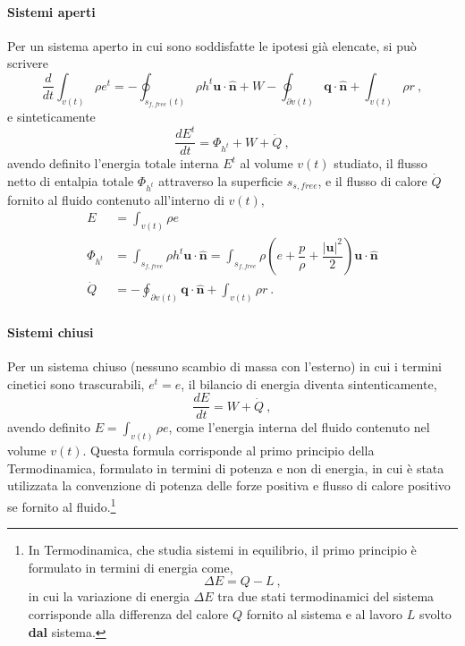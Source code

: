 \paragraph{Sistemi aperti}
Per un sistema aperto in cui sono soddisfatte le ipotesi già elencate, si può scrivere
\begin{equation}
 \dfrac{d}{dt} \displaystyle\int_{v(t)} \rho e^t = - \oint_{s_{f,free}(t)} \rho h^t \bm{u} \cdot \bm{\hat{n}}
  + W - \oint_{\partial v(t)} \bm{q} \cdot \bm{\hat{n}} + \int_{v(t)} \rho r \ ,
\end{equation}
e sinteticamente
\begin{equation}
  \dfrac{d E^t}{d t} = \Phi_{h^t} + W + \dot{Q} \ ,
\end{equation}
avendo definito l'energia totale interna $E^t$ al volume $v(t)$ studiato, il flusso netto di entalpia totale $\Phi_{h^t}$ attraverso la superficie $s_{s,free}$, e il flusso di calore $\dot{Q}$ fornito al fluido contenuto all'interno di $v(t)$,
\begin{equation}
\begin{aligned}
  E & = \int_{v(t)} \rho e \\
  \Phi_{h^t} & = \int_{s_{f,free}} \rho h^t \bm{u} \cdot \bm{\hat{n}}
               = \int_{s_{f,free}} \rho \left( e + \dfrac{p}{\rho} + \dfrac{|\bm{u}|^2}{2} \right) \bm{u} \cdot \bm{\hat{n}} \\
 \dot{Q} & = - \oint_{\partial v(t)} \bm{q} \cdot \bm{\hat{n}} + \int_{v(t)} \rho r \ . 
\end{aligned}
\end{equation}

\paragraph{Sistemi chiusi}
Per un sistema chiuso (nessuno scambio di massa con l'esterno) in cui i termini cinetici sono trascurabili, $e^t = e$, il bilancio di energia diventa sintenticamente,
\begin{equation}
 \dfrac{d E}{dt} = W + \dot{Q} \ ,
\end{equation}
avendo definito $E = \displaystyle\int_{v(t)} \rho e$, come l'energia interna del fluido contenuto nel volume $v(t)$.
Questa formula corrisponde al primo principio della Termodinamica, formulato in termini di potenza e non di energia, in cui è stata utilizzata la convenzione di potenza delle forze positiva e flusso di calore positivo se fornito al fluido.\footnote{In Termodinamica, che studia sistemi in equilibrio, il primo principio è formulato in termini di energia come,
\begin{equation}
 \Delta E = Q - L \ ,
\end{equation}
in cui la variazione di energia $\Delta E$ tra due stati termodinamici del sistema corrisponde alla differenza del calore $Q$ fornito al sistema e al lavoro $L$ svolto \textbf{dal} sistema.
}

